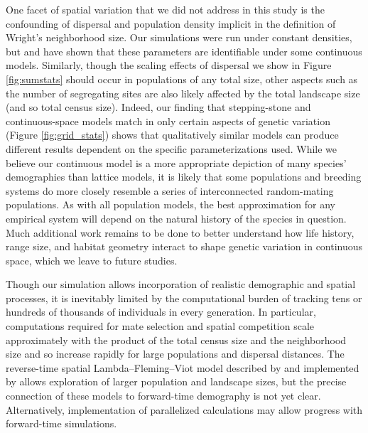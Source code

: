 \documentclass[10pt,twoside,lineno,hidelinks]{preprint}
\begin{document}
One facet of spatial variation that we did not address in this study is the confounding of dispersal and population density implicit in the definition of Wright's neighborhood size. Our simulations were run under constant densities, but \citet{guindon2016demographic} and \citet{Ringbauer2017} 
have shown that these parameters are identifiable under some continuous models. Similarly, though the scaling effects of dispersal we show in Figure \ref{fig:sumstats} should occur in populations of any total size, other aspects such as the number of segregating sites are also likely affected by the total landscape size (and so total census size).  
Indeed, our finding that stepping-stone and continuous-space models match
in only certain aspects of genetic variation (Figure \ref{fig:grid_stats})
shows that qualitatively similar models can produce different results dependent on the specific parameterizations used.
While we believe our continuous model is a more appropriate depiction of 
many species' demographies than lattice models,
it is likely that some populations and breeding systems do more closely resemble a series of interconnected random-mating populations. As with all population models, the best approximation for any empirical system will depend on the natural history of the species in question. 
Much additional work remains to be done to better understand how life history, range size,
and habitat geometry interact to shape genetic variation in continuous space, which we leave to future studies. 

Though our simulation allows incorporation of realistic demographic and spatial processes, 
it is inevitably limited by the computational burden of tracking tens or hundreds of thousands of individuals in every generation. 
In particular, computations required for mate selection and spatial competition scale approximately with the product of the total census size and the neighborhood size and so increase rapidly for large populations and dispersal distances. 
The reverse-time spatial Lambda--Fleming--Viot model described by \citet{Barton2010} and implemented by \citet{Kelleher2014} 
allows exploration of larger population and landscape sizes,
but the precise connection of these models to forward-time demography is not yet clear.
Alternatively, implementation of parallelized calculations may allow progress with forward-time simulations.
\end{document}
